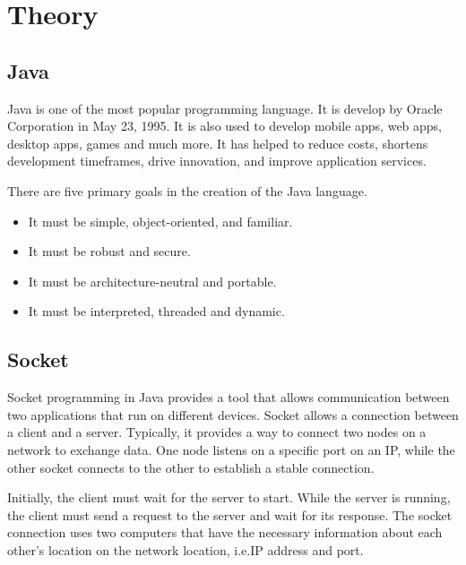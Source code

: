 \chapter{Theory}\label{ch:theory}
\section{Java}\label{sec:java}
    Java is one of the most popular programming language.
    It is develop by Oracle Corporation in May 23, 1995.
    It is also used to develop mobile apps, web apps, desktop apps, games and much more.
    It has helped to reduce costs, shortens development timeframes, drive innovation,
    and improve application services.
    \medskip

    \noindent
    There are five primary goals in the creation of the Java language.
    \begin{itemize}
        \item It must be simple, object-oriented, and familiar.
        \item It must be robust and secure.
        \item It must be architecture-neutral and portable.
        \item It must be interpreted, threaded and dynamic.
    \end{itemize}

    \section{Socket}\label{sec:socket}
    Socket programming in Java provides a tool that allows communication between two applications
    that run on different devices.
    Socket allows a connection between a client and a server.
    Typically, it provides a way to connect two nodes on a network to exchange data.
    One node listens on a specific port on an IP, while the other socket connects to the other to
    establish a stable connection.
    \medskip

    \noindent
    Initially, the client must wait for the server to start.
    While the server is running, the client must send a request to the server and wait for its
    response.
    The socket connection uses two computers that have the necessary information about each
    other's location on the network location, i.e.IP address and port.
    \medskip

